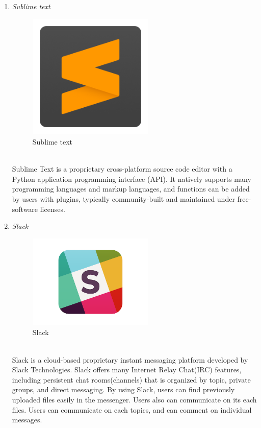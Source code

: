 \documentclass[conference]{IEEEtran}
\begin{document}
\begin{enumerate}
   \item \textit{Sublime text }
             \begin{figure}[htbp]
    \centerline{\includegraphics[width=60mm, scale=0.5]{fig/sublime.png}}
    \caption{Sublime text}
    \label{fig}
    \end{figure}
   \\Sublime Text is a proprietary cross-platform source code editor with a Python application programming interface (API). It natively supports many programming languages and markup languages, and functions can be added by users with plugins, typically community-built and maintained under free-software licenses.\\
   \item \textit{Slack }
                \begin{figure}[htbp]
    \centerline{\includegraphics[width=60mm, scale=0.5]{fig/slack.png}}
    \caption{Slack}
    \label{fig}
    \end{figure}
   \\Slack is a cloud-based proprietary instant messaging platform developed by Slack Technologies. Slack offers many Internet Relay Chat(IRC) features, including persistent chat rooms(channels) that is organized by topic, private groups, and direct messaging. By using Slack, users can find previously uploaded files easily in the messenger. Users also can communicate on its each files. Users can communicate on each topics, and can comment on individual messages.\\

\end{enumerate}
\end{document}
